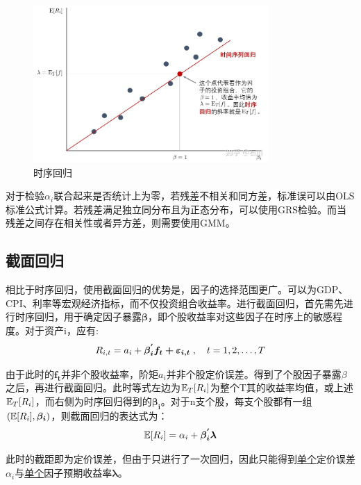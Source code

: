 \documentclass[11pt]{article}
\begin{document}
\begin{figure}[H]
    \centering
    \includegraphics[width=0.8\textwidth]{fig/ts_reg.jpg}
    \caption{时序回归}
    \label{fig：ts_reg}
\end{figure}

对于检验$\alpha_i$联合起来是否统计上为零，若残差不相关和同方差，标准误可以由OLS标准公式计算。若残差满足独立同分布且为正态分布，可以使用GRS检验。而当残差之间存在相关性或者异方差，则需要使用GMM。

\subsection{截面回归}

相比于时序回归，使用截面回归的优势是，因子的选择范围更广。可以为GDP、CPI、利率等宏观经济指标，而不仅投资组合收益率。进行截面回归，首先需先进行时序回归，用于确定因子暴露$\bm{\beta}$，即个股收益率对这些因子在时序上的敏感程度。对于资产i，应有:
\begin{equation*}
    R_{i,t} = a_i + \bm{\beta_{i}^{'} f_t + \varepsilon_{i,t}} \;,\quad t=1,2,\dots,T
\end{equation*}

由于此时的$\bm{f_t}$并非个股收益率，阶矩$a_i$并非个股定价误差。得到了个股因子暴露$\beta$之后，再进行截面回归。此时等式左边为$\mathbb{E}_T[R_i]$为整个T其的收益率均值，或上述$\mathbb{E}_T[R_i]$，而右侧为时序回归得到的$\bm{\beta_i}$。对于n支个股，每支个股都有一组$(\mathbb{E}[R_i],\bm{\beta_i})$，则截面回归的表达式为：
\begin{equation*}
    \mathbb{E}[R_i] = \alpha_i + \bm{\beta_{i}^{'} \lambda}
\end{equation*}

此时的截距即为定价误差，但由于只进行了一次回归，因此只能得到\uline{单个}定价误差$\alpha_i$与\uline{单个}因子预期收益率$\bm{\lambda}$。
\end{document}
